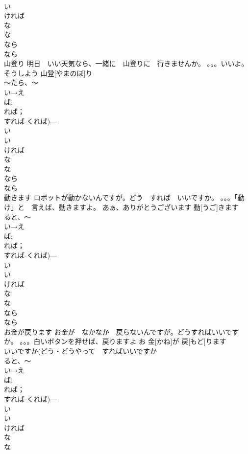 \documentclass[8pt]{extreport}
\begin{document}
\begin{CJK}{UTF8}{min}
\\	い　
\\	ければ　
\\	な 
\\	な
\\	なら　
\\	なら
\\	山登り	明日　いい天気なら、一緒に　山登りに　行きませんか。 。。。いいよ。そうしよう	山登[やまのぼ]り			
\\	～たら、～
\\	い→え
\\	ば;
\\	れば；
\\	すれば-くれば)―　
\\	い
\\	い　
\\	ければ　
\\	な 
\\	な
\\	なら　
\\	なら
\\	動きます	ロボットが動かないんですが。どう　すれば　いいですか。 。。。「動け」と　言えば、動きますよ。 あぁ、ありがとうございます	動[うご]きます			
\\	ると、～	
\\	い→え
\\	ば;
\\	れば；
\\	すれば-くれば)―　
\\	い
\\	い　
\\	ければ　
\\	な 
\\	な
\\	なら　
\\	なら
\\	お金が戻ります	お金が　なかなか　戻らないんですが。どうすればいいですか。 。。。白いボタンを押せば、戻りますよ	お 金[かね]が 戻[もど]ります			
\\	いいですか(どう・どうやって　すればいいですか　
\\	ると、～	
\\	い→え
\\	ば;
\\	れば；
\\	すれば-くれば)―　
\\	い
\\	い　
\\	ければ　
\\	な 
\\	な

\end{CJK}
\end{document}
